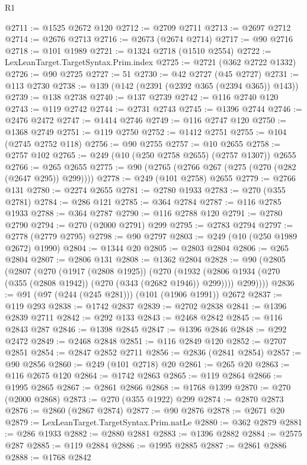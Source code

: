 \begin{lexlean}{R1}
\begin{coremodule}
@2711 := @1525 @2672 @120
@2712 := @2709 @2711
@2713 := @2697 @2712
@2714 := @2676 @2713
@2716 := @2673 (@2674 @2714)
@2717 := @90 @2716
@2718 := @101 @1989
@2721 := @1324 @2718 (@1510 @2554)
@2722 := LexLeanTarget.TargetSyntax.Prim.index
@2725 := @2721 (@362 @2722 @1332)
@2726 := @90 @2725
@2727 := 51
@2730 := @42 @2727 (@45 @2727)
@2731 := @113 @2730
@2738 := @139 (@142 (@2391 (@2392 @365 (@2394 @365)) @143))
@2739 := @138 @2738
@2740 := @137 @2739
@2742 := @116 @2740 @120
@2743 := @119 @2742
@2744 := @2731 @2743
@2745 := @1396 @2744
@2746 := @2476 @2472
@2747 := @1414 @2746
@2749 := @116 @2747 @120
@2750 := @1368 @2749
@2751 := @119 @2750
@2752 := @1412 @2751
@2755 := @104 (@2745 @2752 @118)
@2756 := @90 @2755
@2757 := @10 @2655
@2758 := @2757 @102
@2765 := @249 (@10 (@250 @2758 @2655) (@2757 @1307)) @2655
@2766 := @265 @2655
@2775 := @90 (@2765 (@2766 @267 (@275 (@270 (@282 (@2647 @295)) @299))))
@2778 := @249 (@101 @2758) @2655
@2779 := @2766 @131
@2780 := @2274 @2655
@2781 := @2780 @1933
@2783 := @270 (@355 @2781)
@2784 := @286 @121
@2785 := @364 @2784
@2787 := @116 @2785 @1933
@2788 := @364 @2787
@2790 := @116 @2788 @120
@2791 := @2780 @2790
@2794 := @270 (@2000 @2791) @299
@2795 := @2783 @2794
@2797 := @2778 (@2779 @2795)
@2798 := @90 @2797
@2803 := @249 (@10 (@250 @1989 @2672) @1990)
@2804 := @1344 @20
@2805 := @2803 @2804
@2806 := @265 @2804
@2807 := @2806 @131
@2808 := @1362 @2804
@2828 := @90
    (@2805
      (@2807
        (@270
          (@1917 (@2808 @1925))
          (@270
            (@1932 (@2806 @1934 (@270 (@355 (@2808 @1942)) (@270 (@343 (@2682 @1946)) @299))))
            @299))))
@2836 := @91 (@97 (@244 (@245 @281))) (@101 (@1906 @1991)) @2672
@2837 := @119 @293
@2838 := @1742 @2837
@2839 := @2702 @2838
@2841 := @1396 @2839 @2711
@2842 := @292 @133
@2843 := @2468 @2842
@2845 := @116 @2843 @287
@2846 := @1398 @2845
@2847 := @1396 @2846
@2848 := @292 @2472
@2849 := @2468 @2848
@2851 := @116 @2849 @120
@2852 := @2707 @2851
@2854 := @2847 @2852 @2711
@2856 := @2836 (@2841 @2854)
@2857 := @90 @2856
@2860 := @249 (@101 @2718) @20
@2861 := @265 @20
@2863 := @116 @2675 @120
@2864 := @1742 @2863
@2865 := @119 @2864
@2866 := @1995 @2865
@2867 := @2861 @2866
@2868 := @1768 @1399
@2870 := @270 (@2000 @2868)
@2873 := @270 (@355 @1922) @299
@2874 := @2870 @2873
@2876 := @2860 (@2867 @2874)
@2877 := @90 @2876
@2878 := @2671 @20
@2879 := LexLeanTarget.TargetSyntax.Prim.natLe
@2880 := @362 @2879
@2881 := @286 @1933
@2882 := @2880 @2881
@2883 := @1396 @2882
@2884 := @2575 @287
@2885 := @119 @2884
@2886 := @1995 @2885
@2887 := @2861 @2886
@2888 := @1768 @2842

\end{coremodule}
\end{lexlean}
